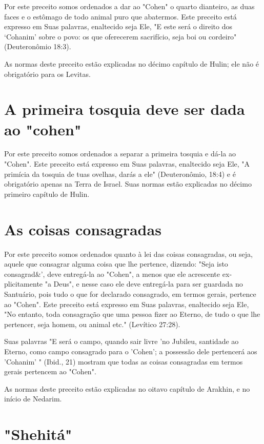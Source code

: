 \begin{itemize}
\begin{enumrate}
\begin{itemize}
\begin{itemize}
\begin{itemize}
Por este preceito somos ordenados a dar ao "Cohen" o quarto dian­teiro,
as duas faces e o estômago de todo animal puro que abatermos. Este
pre­ceito está expresso em Suas palavras, enaltecido seja Ele, "E este
será o direito dos `Cohanim' sobre o povo: os que oferecerem sacrifício,
seja boi ou cordei­ro" (Deuteronômio 18:3).

As normas deste preceito estão explicadas no décimo capítulo de Hu­lin;
ele não é obrigatório para os Levitas.

\section{A primeira tosquia deve ser dada ao "cohen"}

Por este preceito somos ordenados a separar a primeira tosquia e dá-la
ao "Cohen". Este preceito está expresso em Suas palavras, enaltecido
seja Ele, "A primícia da tosquia de tuas ovelhas, darás a ele"
(Deuteronômio, 18:4) e é obrigatório apenas na Terra de Israel. Suas
normas estão explicadas no décimo primeiro capítulo de Hulin.

\section{As coisas consagradas}

Por este preceito somos ordenados quanto à lei das coisas consagra­das,
ou seja, aquele que consagrar alguma coisa que lhe pertence, dizendo:
"Seja isto consagrad\&', deve entregá-la ao "Cohen", a menos que ele
acrescente ex­plicitamente "a Deus", e nesse caso ele deve entregá-la
para ser guardada no Santuário, pois tudo o que for declarado
consagrado, em termos gerais, perten­ce ao "Cohen". Este preceito está
expresso em Suas palavras, enaltecido seja Ele, "No entanto, toda
consagração que uma pessoa fizer ao Eterno, de tudo o que lhe pertencer,
seja homem, ou animal etc." (Levítico 27:28).

Suas palavras "E será o campo, quando sair livre 'no Jubileu, santida­de
ao Eterno, como campo consagrado para o 'Cohen'; a possessão dele
per­tencerá aos 'Cohanim' " (Ibid., 21) mostram que todas as coisas
consagradas em termos gerais pertencem ao "Cohen".

As normas deste preceito estão explicadas no oitavo capítulo de
Arak­hin, e no início de Nedarim.

\section{"Shehitá"}


\end{itemize}
\end{itemize}
\end{itemize}
\end{enumrate}
\end{itemize}
